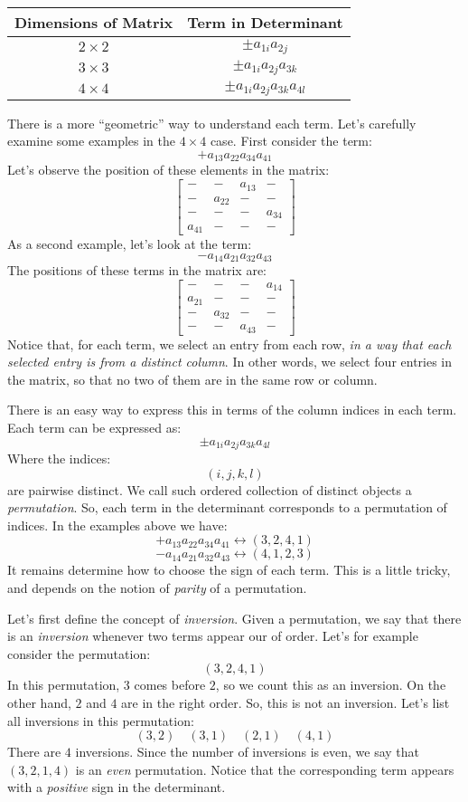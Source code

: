 \documentclass[12pt]{article}
\begin{document}
\begin{center}
\begin{tabular}{|c|c|}\hline
Dimensions of Matrix & Term in Determinant\\\hline
$2\times 2$ & $\pm a_{1i}a_{2j}$\\\hline
$3\times 3$ & $\pm a_{1i}a_{2j}a_{3k}$\\\hline
$4\times 4$ & $\pm a_{1i}a_{2j}a_{3k}a_{4l}$\\\hline
\end{tabular}
\end{center}
There is a more ``geometric'' way to understand each term. Let's carefully examine some examples in the $4\times 4$ case. First consider the term:
\[
+a_{13} a_{22} a_{34} a_{41}
\]
Let's observe the position of these elements in the matrix:
\[
\begin{bmatrix}
-&-&a_{13}&-\\
-&a_{22}&-&-\\
-&-&-&a_{34}\\
a_{41}&-&-&-
\end{bmatrix}
\]
As a second example, let's look at the term:
\[
- a_{14} a_{21} a_{32} a_{43} 
\]
The positions of these terms in the matrix are:
\[
\begin{bmatrix}
-&-&-&a_{14}\\
a_{21}&-&-&-\\
-&a_{32}&-&-\\
-&-&a_{43}&-
\end{bmatrix}
\]
Notice that, for each term, we select an entry from each row, \emph{in a way that each selected entry is  from a distinct column}. In other words, we select four entries in the matrix, so that no two of them are   in the same row or column.

There is an easy way to express this in terms of the column indices in each term. Each term can be expressed as:
\[
\pm a_{1i}a_{2j}a_{3k}a_{4l}
\]
Where the indices:
\[
(i,j,k,l)
\]
are pairwise distinct. We call such ordered collection of distinct objects a \emph{permutation}. So, each term in the determinant corresponds to a permutation of indices. In the examples above we have:
\[
+a_{13} a_{22} a_{34} a_{41} \leftrightarrow (3,2,4,1)
\]
\[
- a_{14} a_{21} a_{32} a_{43} \leftrightarrow (4,1,2,3)
\]
It remains determine how to choose the sign of each term. This is a little tricky, and depends on the notion of \emph{parity} of a permutation.

Let's first define the concept of \emph{inversion}. Given a permutation, we say that there is an \emph{inversion} whenever two terms appear our of order. Let's for example consider the permutation:
\[
(3,2,4,1)
\]
In this permutation, $3$ comes before $2$, so we count this as an inversion. On the other hand, $2$ and $4$ are in the right order. So, this is not an inversion. Let's list all inversions in this permutation:
\[
(3,2)\quad
(3,1)\quad
(2,1)\quad
(4,1)
\]
There are $4$ inversions. Since the number of inversions is even, we say that $(3,2,1,4)$ is an \emph{even} permutation. Notice that the corresponding term appears with a \emph{positive} sign in the determinant.
\end{document}
